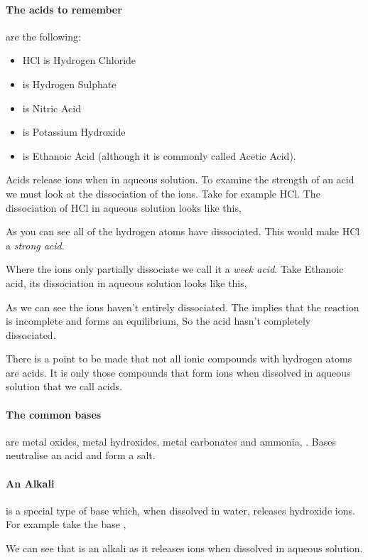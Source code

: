 \documentclass[11pt,a4paper]{memoir}
\begin{document}
	\paragraph{The acids to remember} are the following:
	\begin{itemize}
		\item HCl is Hydrogen Chloride
		\item {} is Hydrogen Sulphate
		\item {} is Nitric Acid
		\item {} is Potassium Hydroxide
		\item {} is Ethanoic Acid (although it is commonly called Acetic Acid).
	\end{itemize}
	
	Acids release  ions when in aqueous solution. To examine the strength of an acid we must look at the dissociation of the  ions. Take for example HCl. The dissociation of HCl in aqueous solution looks like this, 
	\begin{center}
	\end{center}
	As you can see all of the hydrogen atoms have dissociated. This would make HCl a \textit{strong acid}. 
	
	Where the  ions only partially dissociate we call it a \textit{week acid}. Take Ethanoic acid, its dissociation in aqueous solution looks like this, 
	\begin{center}
	\end{center}
	 As we can see the  ions haven't entirely dissociated. The \ch{<=>} implies that the reaction is incomplete and forms an equilibrium, So the acid hasn't completely dissociated.
	
	There is a point to be made that not all ionic compounds with hydrogen atoms are acids. It is only those compounds that form  ions when dissolved in aqueous solution that we call acids.
	
	\paragraph{The common bases} are metal oxides, metal hydroxides, metal carbonates and ammonia, . Bases neutralise an acid and form a salt.
	
	\paragraph{An Alkali} is a special type of base which, when dissolved in water, releases hydroxide ions. For example take the base ,
	\begin{center}
	\end{center}
	We can see that  is an alkali as it releases  ions when dissolved in aqueous solution.
	
\end{document}

